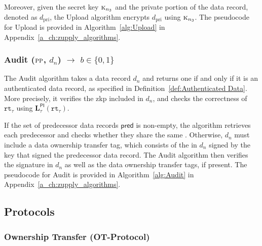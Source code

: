 Moreover, given the secret key $\textsc{k}_{n_3}$ and the private portion of the data record, denoted as $d_\text{pri}$, the \textsf{Upload} algorithm encrypts $d_\text{pri}$ using $\textsc{k}_{n_3}$. The pseudocode for \textsf{Upload} is provided in Algorithm~\ref{alg:Upload} in Appendix~\ref{a_ch:zupply_algorithms}.




\subsubsection{\textsf{Audit} ($\textsc{pp}$, $d_n$) $\rightarrow$ $b \in \{0, 1\}$}

The \textsf{Audit} algorithm takes a data record \(d_{n}\) and returns one if and only if it is an authenticated data record, as specified in Definition~\ref{def:Authenticated Data}. More precisely, it verifies the \gls{zkp} included in \(d_n\), and checks the correctness of \(\texttt{rt}_\tau\) using \(\mathbf{L}_\tau^\mathsf{PI}(\texttt{rt}_\tau)\).

If the set of predecessor data records \(\textsf{pred}\) is non-empty, the algorithm retrieves each predecessor and checks whether they share the same . Otherwise, \(d_n\) must include a data ownership transfer tag, which consists of the  in \(d_n\) signed by the key that signed the predecessor data record. The \textsf{Audit} algorithm then verifies the signature in \(d_n\) as well as the data ownership transfer tags, if present. The pseudocode for \textsf{Audit} is provided in Algorithm~\ref{alg:Audit} in Appendix~\ref{a_ch:zupply_algorithms}.



\subsection{Protocols}
\label{sec:Zupply-Protocols}

\subsubsection{Ownership Transfer (\textsf{OT-Protocol})}
\label{sec:Ownership Transfer}

